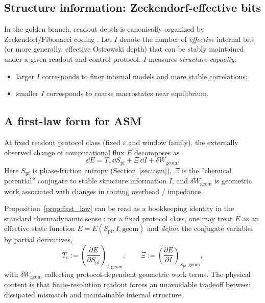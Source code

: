 \subsection{Structure information: Zeckendorf-effective bits}

In the golden branch, readout depth is canonically organized by Zeckendorf/Fibonacci coding \cite{Zeckendorf1972}. Let $I$ denote the number of \emph{effective} internal bits (or more generally, effective Ostrowski depth) that can be stably maintained under a given readout-and-control protocol. $I$ measures \emph{structure capacity}:
\begin{itemize}
  \item larger $I$ corresponds to finer internal models and more stable correlations;
  \item smaller $I$ corresponds to coarse macrostates near equilibrium.
\end{itemize}

\subsection{A first-law form for ASM}

\begin{proposition}
\label{prop:first_law}
At fixed readout protocol class (fixed $\varepsilon$ and window family), the externally observed change of computational flux $E$ decomposes as
\begin{equation}
\dd E = T_c\, \dd S_{\mathrm{pf}} + \Xi\, \dd I + \delta W_{\mathrm{geom}}.
\end{equation}
Here $S_{\mathrm{pf}}$ is phase-friction entropy (Section~\ref{sec:asm}), $\Xi$ is the ``chemical potential'' conjugate to stable structure information $I$, and $\delta W_{\mathrm{geom}}$ is geometric work associated with changes in routing overhead / impedance.
\end{proposition}

\noindent Proposition~\ref{prop:first_law} can be read as a bookkeeping identity in the standard thermodynamic sense \cite{LandauLifshitz1980}: for a fixed protocol class, one may treat $E$ as an effective state function $E=E(S_{\mathrm{pf}},I,\text{geom})$ and \emph{define} the conjugate variables by partial derivatives,
\[
  T_c:=\left(\frac{\partial E}{\partial S_{\mathrm{pf}}}\right)_{I,\text{geom}},
  \qquad
  \Xi:=\left(\frac{\partial E}{\partial I}\right)_{S_{\mathrm{pf}},\text{geom}},
\]
with $\delta W_{\mathrm{geom}}$ collecting protocol-dependent geometric work terms. The physical content is that finite-resolution readout forces an unavoidable tradeoff between dissipated mismatch and maintainable internal structure.

